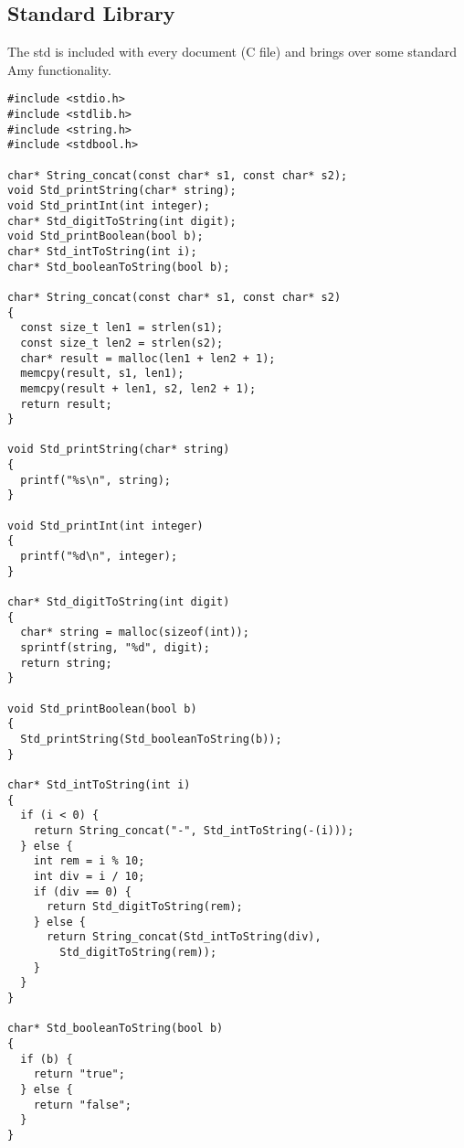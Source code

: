\subsection{Standard Library}

The std is included with every document (C file) and brings over some standard Amy functionality.


\begin{lstlisting}
#include <stdio.h>
#include <stdlib.h>
#include <string.h>
#include <stdbool.h>

char* String_concat(const char* s1, const char* s2);
void Std_printString(char* string);
void Std_printInt(int integer);
char* Std_digitToString(int digit);
void Std_printBoolean(bool b);
char* Std_intToString(int i);
char* Std_booleanToString(bool b);

char* String_concat(const char* s1, const char* s2) 
{
  const size_t len1 = strlen(s1);
  const size_t len2 = strlen(s2);
  char* result = malloc(len1 + len2 + 1);
  memcpy(result, s1, len1);
  memcpy(result + len1, s2, len2 + 1);
  return result;
}

void Std_printString(char* string) 
{
  printf("%s\n", string);
}

void Std_printInt(int integer) 
{
  printf("%d\n", integer);
}

char* Std_digitToString(int digit) 
{
  char* string = malloc(sizeof(int));
  sprintf(string, "%d", digit);
  return string;
}

void Std_printBoolean(bool b) 
{
  Std_printString(Std_booleanToString(b));
}

char* Std_intToString(int i) 
{
  if (i < 0) {
    return String_concat("-", Std_intToString(-(i)));
  } else {
    int rem = i % 10;
    int div = i / 10;
    if (div == 0) {
      return Std_digitToString(rem);
    } else {
      return String_concat(Std_intToString(div), 
      	Std_digitToString(rem));
    }
  }
}

char* Std_booleanToString(bool b) 
{
  if (b) {
    return "true";
  } else {
    return "false";
  }
}

\end{lstlisting}

